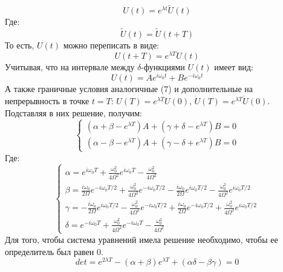 \documentclass[11pt]{article}    %
\begin{document}
\begin{equation}
    U(t) = e^{\lambda t} \widetilde{U}(t)
\end{equation}
Где:
\begin{equation}
    \widetilde{U}(t) = \widetilde{U}(t+T)
\end{equation}
То есть, $U(t)$ можно переписать в виде:
\begin{equation}
    U(t+T) = e^{\lambda T} U(t)
\end{equation}
Учитывая, что на интервале между $\delta$-функциями $U(t)$ имеет вид:
\begin{equation}
    U(t) = Ae^{i\omega_0 t} + Be^{-i\omega_0 t}
\end{equation}
А также граничные условия аналогичные (7) и дополнительные на непрерывность в точке $t=T$: $U(T) = e^{\lambda T}U(0)$, $\dot{U}(T) = e^{\lambda T}\dot{U}(0)$.
Подставляя в них решение, получим:
\begin{equation}
    \begin{cases}
    (\alpha + \beta - e^{\lambda T})A + (\gamma + \delta - e^{\lambda T})B = 0
    \\
    (\alpha - \beta - e^{\lambda T})A + (\gamma - \delta + e^{\lambda T})B = 0
    \end{cases}
\end{equation}
Где:
\begin{equation}
    \begin{cases}
    \alpha = e^{i\omega_0 T} + \frac{\omega_0^2}{4\Omega^2} e^{i\omega_0 T} - \frac{\omega_0^2}{4\Omega^2}
    \\
    \beta = \frac{i\omega_0}{2\Omega} e^{-i\omega_0 T/2} + \frac{\omega_0^2}{4\Omega^2} e^{-i\omega_0 T/2} - \frac{i\omega_0}{2\Omega} e^{i\omega_0 T/2} - \frac{\omega_0^2}{4\Omega^2} e^{i\omega_0 T/2}
    \\
    \gamma =  -\frac{i\omega_0}{2\Omega} e^{i\omega_0 T/2} - \frac{\omega_0^2}{4\Omega^2} e^{-i\omega_0 T/2} + \frac{i\omega_0}{2\Omega} e^{-i\omega_0 T/2} + \frac{\omega_0^2}{4\Omega^2} e^{i\omega_0 T/2}
    \\
    \delta = e^{-i\omega_0 T} + \frac{\omega_0^2}{4\Omega^2} e^{-i\omega_0 T} - \frac{\omega_0^2}{4\Omega^2}
    \end{cases}
\end{equation}
Для того, чтобы система уравнений имела решение необходимо, чтобы ее определитель был равен $0$.
\begin{equation}
    det = e^{2\lambda T} - (\alpha + \beta) e^{\lambda T} + (\alpha \delta - \beta \gamma ) = 0
\end{equation}
\end{document}
